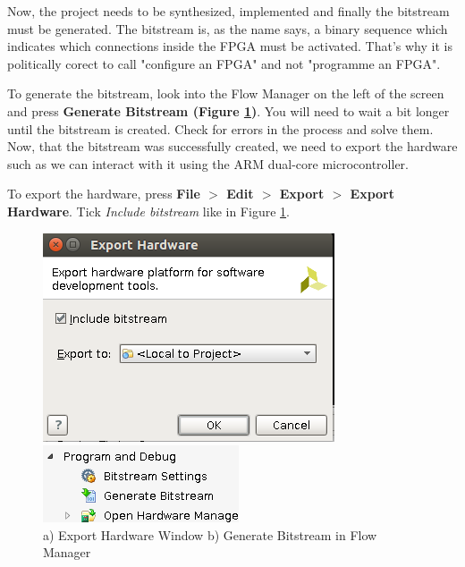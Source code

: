\documentclass{article}
\begin{document}
\begin{enumerate}
Now, the project needs to be synthesized, implemented and finally the bitstream must 
be generated.
The bitstream is, as the name says, a binary sequence which indicates which connections inside the FPGA must be activated. That's why it is politically corect to call "configure an FPGA" and not "programme an FPGA".

To generate the bitstream, look into the Flow Manager on the left of the screen and press \textbf{Generate Bitstream (Figure \ref{fig:export_hardware_generate_bitstream})}. You will need to wait a bit longer until the bitstream is created. Check for errors in the process and solve them. Now, that the bitstream was successfully created, we need to export the hardware such as we can interact with it using the ARM dual-core microcontroller. 

To export the hardware, press \textbf{File $>$ Edit $>$ Export $>$ Export Hardware}. Tick \textit{Include bitstream} like in Figure \ref{fig:export_hardware_generate_bitstream}.


 \begin{figure}[h!]
\centering
\begin{minipage}{.425\textwidth}
  \centering
  \includegraphics[width=0.8\linewidth]{img/export_hardware.png}
\end{minipage}%
\begin{minipage}{.425\textwidth}
  \centering
  \includegraphics[width=0.8\linewidth]{img/generate_bitstream.png}
\end{minipage}
\caption{a) Export Hardware Window b) Generate Bitstream in Flow Manager}
\label{fig:export_hardware_generate_bitstream}
\end{figure}



\end{enumerate}
\end{document}
